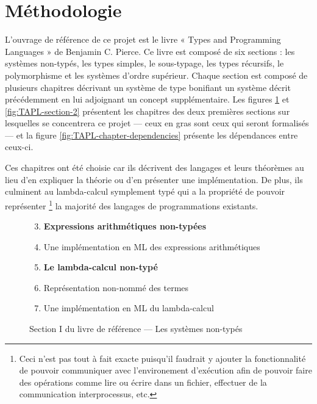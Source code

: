 \documentclass[a4paper, oneside, 12pt, titlepage, draft]{article}
\begin{document}
\section{Méthodologie}

%

L'ouvrage de référence de ce projet est le livre « Types and Programming Languages » de Benjamin C.
Pierce. Ce livre est composé de six sections : les systèmes non-typés, les types simples, le
sous-typage, les types récursifs, le polymorphisme et les systèmes d'ordre supérieur. Chaque section
est composé de plusieurs chapitres décrivant un système de type bonifiant un système décrit
précédemment en lui adjoignant un concept supplémentaire. Les figures \ref{fig:TAPL-section-1} et
\ref{fig:TAPL-section-2} présentent les chapitres des deux premières sections sur lesquelles se
concentrera ce projet --- ceux en gras sont ceux qui seront formalisés--- et la figure
\ref{fig:TAPL-chapter-dependencies} présente les dépendances entre ceux-ci.

Ces chapitres ont été choisie car ils décrivent des langages et leurs théorèmes au lieu d'en
expliquer la théorie ou d'en présenter une implémentation. De plus, ils culminent au lambda-calcul
symplement typé qui a la propriété de pouvoir représenter \footnote{Ceci n'est pas tout à fait
exacte puisqu'il faudrait y ajouter la fonctionnalité de pouvoir communiquer avec l'environement
d'exécution afin de pouvoir faire des opérations comme lire ou écrire dans un fichier, effectuer de
la communication interprocessus, etc.} la majorité des langages de programmations existants.

\begin{figure}[h]
  \begin{enumerate}[label=§ \arabic*]
      \setcounter{enumi}{2}
    \item \textbf{Expressions arithmétiques non-typées}
    \item Une implémentation en ML des expressions arithmétiques
    \item \textbf{Le lambda-calcul non-typé}
    \item Représentation non-nommé des termes
    \item Une implémentation en ML du lambda-calcul
  \end{enumerate}
  \caption{Section I du livre de référence --- Les systèmes non-typés}
  \label{fig:TAPL-section-1}
\end{figure}
\end{document}
